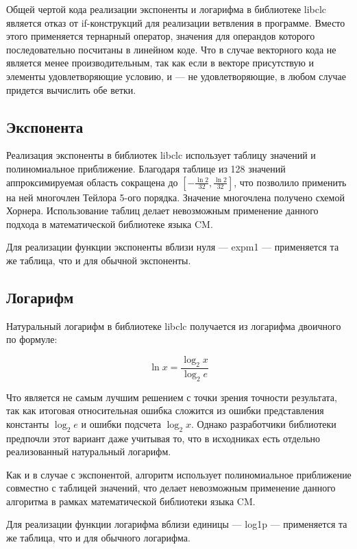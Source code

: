 Общей чертой кода реализации экспоненты и логарифма в библиотеке libclc является отказ от if-конструкций для реализации ветвления в программе.
Вместо этого применяется тернарный оператор, значения для операндов которого последовательно посчитаны в линейном коде.
Что в случае векторного кода не является менее производительным, так как если в векторе присутствую и элементы удовлетворяющие условию, и --- не удовлетворяющие, в любом случае придется вычислить обе ветки.

\subsection{Экспонента}

Реализация экспоненты в библиотек libclc использует таблицу значений и полиномиальное приближение.
Благодаря таблице из 128 значений аппроксимируемая область сокращена до $[-\frac{\ln{2}}{32}, \frac{\ln{2}}{32}]$, что позволило применить на ней многочлен Тейлора 5-ого порядка.
Значение многочлена получено схемой Хорнера.
Использование таблиц делает невозможным применение данного подхода в математической библиотеке языка CM.

Для реализации функции экспоненты вблизи нуля --- expm1 --- применяется та же таблица, что и для обычной экспоненты.

\subsection{Логарифм}

Натуральный логарифм в библиотеке libclc получается из логарифма двоичного по формуле:

\begin{equation}
    \ln{x} = \frac{\log_{2}{x}}{\log_{2}{e}}
\end{equation}

Что является не самым лучшим решением с точки зрения точности результата, так как итоговая относительная ошибка сложится из ошибки представления константы $\log_{2}{e}$ и ошибки подсчета $\log_{2}{x}$.
Однако разработчики библиотеки предпочли этот вариант даже учитывая то, что в исходниках есть отдельно реализованный натуральный логарифм.

Как и в случае с экспонентой, алгоритм использует полиномиальное приближение совместно с таблицей значений, что делает невозможным применение данного алгоритма в рамках математической библиотеки языка CM.

Для реализации функции логарифма вблизи единицы --- log1p --- применяется та же таблица, что и для обычного логарифма.

